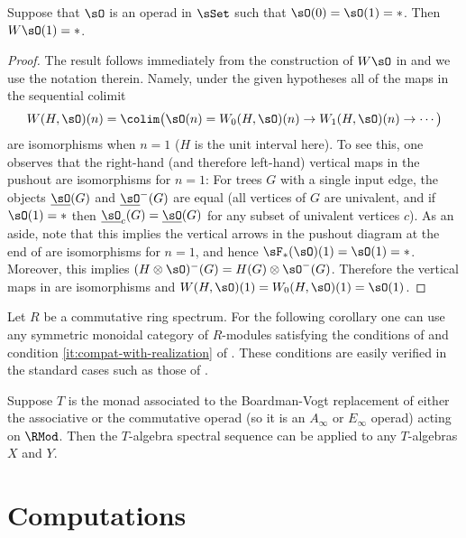 \documentclass[leqno,oneside,english]{elsarticle}
\begin{document}
\begin{lem}
  \label{lem:W-constr-is-pt-in-deg-one}
  Suppose that $\sO$ is an operad in $\sSet$ such that $\sO(0) = \sO(1) = *$.
  Then $W\sO(1) = *$.
\end{lem}
\begin{proof}
  The result follows immediately from the construction of $W\sO$ in
  \cite{BeM06} and we use the notation therein. Namely, under the given
  hypotheses all of the maps in the sequential colimit
  \[
  W(H,\sO)(n) = \colim \big(\sO(n) = 
  W_0(H, \sO)(n) \to W_1(H, \sO)(n) \to \cdots \big)
  \]
  are isomorphisms when $n = 1$ ($H$ is the unit interval here).  To
  see this, one observes that the right-hand (and therefore left-hand)
  vertical maps in the pushout \cite[(13)]{BeM06} are isomorphisms for
  $n = 1$: For trees $G$ with a single input edge, the objects
  $\underline{\sO}(G)$ and $\underline{\sO}^-(G)$ are equal (all
  vertices of $G$ are univalent, and if $\sO(1) = *$ then
  $\underline{\sO}_c(G) = \underline{\sO}(G)$ for any subset of
  univalent vertices $c$).  As an aside, note that this implies the
  vertical arrows in the pushout diagram at the end of
  \cite[\S~3]{BeM06} are isomorphisms for $n = 1$, and hence
  $\sF_*(\sO)(1) = \sO(1) = *$.  Moreover, this implies $(H \otimes
  \sO)^-(G) = H(G) \otimes \sO^-(G)$.  Therefore the vertical maps in
  \cite[(13)]{BeM06} are isomorphisms and $W(H,\sO)(1) = W_0(H, \sO)(1)
  = \sO(1)$.
\end{proof}

Let $R$ be a commutative ring spectrum. For the following corollary one
can use any symmetric monoidal category of $R$-modules satisfying
the conditions of 
and condition \eqref{it:compat-with-realization} of . These
conditions are easily verified in the standard cases such as
those of \cite{EKMM97,HSS00,MaM02}.

\begin{cor}
  Suppose $T$ is the monad associated to the Boardman-Vogt replacement
  of either the associative or the commutative operad (so it is an
  $A_\infty$ or $E_{\infty}$ operad) acting on $\RMod$. Then the
  $T$-algebra spectral sequence can be applied to
  any $T$-algebras $X$ and $Y$.
\end{cor}

\section{Computations}\label{sec:computations}
\end{document}
